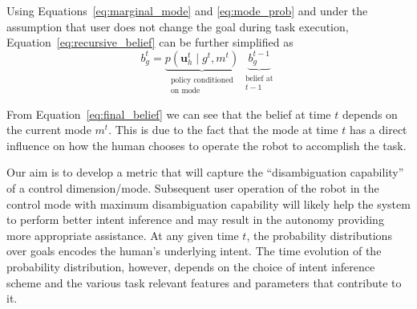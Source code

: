 \documentclass[conference]{IEEEtran}
\begin{document}
Using Equations~\ref{eq:marginal_mode} and \ref{eq:mode_prob} and under the assumption that user does not change the goal during task execution, Equation~\ref{eq:recursive_belief} can be further simplified as 
\begin{equation}\label{eq:final_belief}
	b^t_g = \underbrace{p(\boldsymbol{u}_h^t \;|\; g^t, m^t )}_{\substack{\text{policy conditioned} \\ \text{on mode}}}\;\underbrace{b^{t-1}_{g}}_{\substack{\text{belief at}\\ \text{$t-1$}}}
\end{equation}

From Equation~\ref{eq:final_belief} we can see that the belief at time $t$ depends on the current mode $m^t$. This is due to the fact that the mode at time $t$ has a direct influence on how the human chooses to operate the robot to accomplish the task. 

%

Our aim is to develop a metric that will capture the ``disambiguation capability'' of a control dimension/mode. Subsequent user operation of the robot in the control mode with maximum disambiguation capability will likely help the system to perform better intent inference and may result in the autonomy providing more appropriate assistance.
At any given time $t$, the probability distributions over goals encodes the human's underlying intent. The time evolution of the probability distribution, however, depends on the choice of intent inference scheme and the various task relevant features and parameters that contribute to it. 
\end{document}
